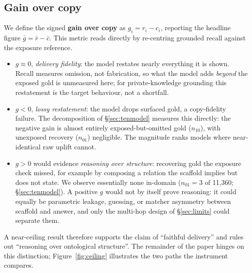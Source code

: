 \documentclass[10pt,twocolumn]{article}
\begin{document}
\subsection{Gain over copy}
We define the signed \textbf{gain over copy} as $g_i=r_i-c_i$, reporting the headline figure $\bar g=\bar r-\bar c$. This metric reads directly by re-centring grounded recall against the exposure reference.
\begin{itemize}[topsep=2pt,itemsep=1pt,leftmargin=1.4em]
\item $g\approx0$, \emph{delivery fidelity}: the model restates nearly everything it is shown. Recall
measures omission, not fabrication, so what the model adds \emph{beyond} the exposed gold is unmeasured
here; for private-knowledge grounding this restatement is the target behaviour, not a shortfall.
\item $g<0$, \emph{lossy restatement}: the model drops surfaced gold, a copy-fidelity failure. The
decomposition of \S\ref{sec:tenmodel} measures this directly: the negative gain is almost entirely
exposed-but-omitted gold ($n_{10}$), with unexposed recovery ($n_{01}$) negligible. The magnitude
ranks models where near-identical raw uplift cannot.
\item $g>0$ would evidence \emph{reasoning over structure}: recovering gold the exposure check missed,
for example by composing a relation the scaffold implies but does not state. We observe essentially
none in-domain ($n_{01}=3$ of 11{,}360; \S\ref{sec:tenmodel}). A positive $g$ would not by itself prove
reasoning: it could equally be parametric leakage, guessing, or matcher asymmetry between scaffold and
answer, and only the multi-hop design of \S\ref{sec:limits} could separate them.
\end{itemize}
A near-ceiling result therefore supports the claim of ``faithful delivery'' and rules out ``reasoning over ontological structure''. The remainder of the paper hinges on this distinction; Figure~\ref{fig:ceiling} illustrates the two paths the instrument compares.


\end{document}
